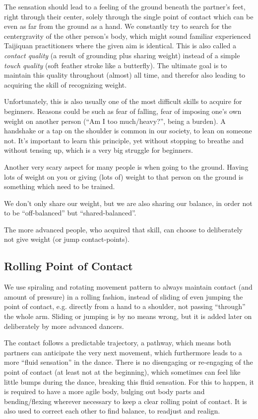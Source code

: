The sensation should lead to a feeling of the ground beneath the partner's feet, right through their center, solely through the single point of contact which can be even as far from the ground as a hand.
We constantly try to search for the \gls{centergravity} of the other person's body, which might sound familiar experienced Taijiquan practitioners where the given aim is identical.
This is also called a \textit{contact quality} (a result of grounding plus sharing weight) instead of a simple \textit{touch quality} (soft feather stroke like a butterfly).
The ultimate goal is to maintain this quality throughout (almost) all time, and therefor also leading to acquiring the skill of recognizing weight.

Unfortunately, this is also usually one of the most difficult skills to acquire for beginners.
Reasons could be such as fear of falling, fear of imposing one's own weight on another person (``Am I too much/heavy?'', being a burden).
A handshake or a tap on the shoulder is common in our society, to lean on someone not.
It's important to learn this principle, yet without stopping to breathe and without tensing up, which is a very big struggle for beginners.

Another very scary aspect for many people is when going to the ground.
Having lots of weight on you or giving (lots of) weight to that person on the ground is something which need to be trained.

We don't only share our weight, but we are also sharing our balance, in order not to be ``off-balanced'' but ``shared-balanced''.

The more advanced people, who acquired that skill, can choose to deliberately not give weight (or jump contact-points).

\subsection{Rolling Point of Contact}\label{subsec:rolling-point-of-contact}

We use spiraling and rotating movement pattern to always maintain contact (and amount of pressure) in a rolling fashion, instead of sliding of even jumping the point of contact, e.g. directly from a hand to a shoulder, not passing ``through'' the whole arm.
Sliding or jumping is by no means wrong, but it is added later on deliberately by more advanced dancers.

The contact follows a predictable trajectory, a pathway, which means both partners can anticipate the very next movement, which furthermore leads to a more ``fluid sensation'' in the dance.
There is no disengaging or re-engaging of the point of contact (at least not at the beginning), which sometimes can feel like little bumps during the dance, breaking this fluid sensation.
For this to happen, it is required to have a more agile body, bulging out body parts and bending/flexing wherever necessary to keep a clear rolling point of contact.
It is also used to correct each other to find balance, to readjust and realign.

